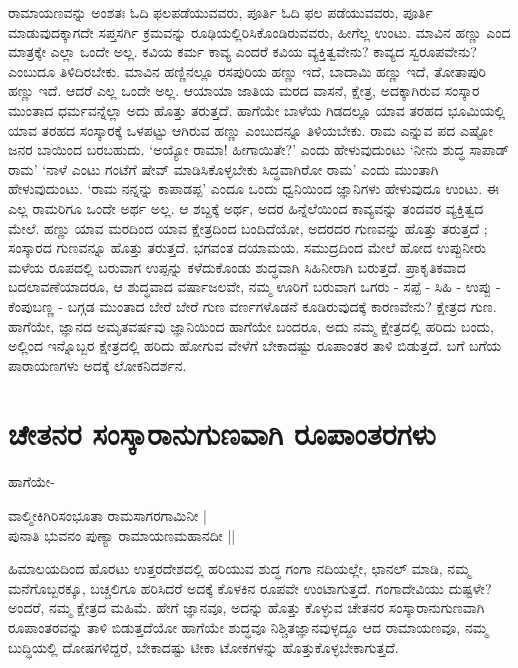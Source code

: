 ರಾಮಾಯಣವನ್ನು ಅಂಶತಃ ಓದಿ ಫಲಪಡೆಯುವವರು, ಪೂರ್ತಿ ಓದಿ ಫಲ ಪಡೆಯುವವರು, ಪೂರ್ತಿ ಮಾಡುವುದಕ್ಕಾಗದೇ ಸಪ್ತಸರ್ಗಿ ಕ್ರಮವನ್ನು ರೂಢಿಯಲ್ಲಿರಿಸಿಕೊಂಡಿರುವವರು, ಹೀಗೆಲ್ಲ ಉಂಟು. ಮಾವಿನ ಹಣ್ಣು ಎಂದ ಮಾತ್ರಕ್ಕೇ ಎಲ್ಲಾ ಒಂದೇ ಅಲ್ಲ. ಕವಿಯ ಕರ್ಮ ಕಾವ್ಯ ಎಂದರೆ ಕವಿಯ ವ್ಯಕ್ತಿತ್ವವೇನು? ಕಾವ್ಯದ ಸ್ವರೂಪವೇನು? ಎಂಬುದೂ ತಿಳಿದಿರಬೇಕು. ಮಾವಿನ ಹಣ್ಣಿನಲ್ಲೂ ರಸಪುರಿಯ ಹಣ್ಣು ಇದೆ, ಬಾದಾಮಿ ಹಣ್ಣು ಇದೆ, ತೋತಾಪುರಿ ಹಣ್ಣು ಇದೆ. ಆದರೆ ಎಲ್ಲ ಒಂದೇ ಅಲ್ಲ. ಆಯಾಯಾ ಜಾತಿಯ ಮರದ ವಾಸನೆ, ಕ್ಷೇತ್ರ, ಅದಕ್ಕಾಗಿರುವ ಸಂಸ್ಕಾರ ಮುಂತಾದ ಧರ್ಮವನ್ನೆಲ್ಲಾ ಅದು ಹೊತ್ತು ತರುತ್ತದೆ. ಹಾಗೆಯೇ ಬಾಳೆಯ ಗಿಡದಲ್ಲೂ ಯಾವ ತರಹದ ಭೂಮಿಯಲ್ಲಿ ಯಾವ ತರಹದ ಸಂಸ್ಕಾರಕ್ಕೆ ಒಳಪಟ್ಟು ಆಗಿರುವ ಹಣ್ಣು ಎಂಬುದನ್ನೂ ತಿಳಿಯಬೇಕು. ರಾಮ ಎನ್ನುವ ಪದ ಎಷ್ಟೋ ಜನರ ಬಾಯಿಂದ ಬರಬಹುದು. `ಅಯ್ಯೋ ರಾಮಾ! ಹೀಗಾಯಿತೇ?' ಎಂದು ಹೇಳುವುದುಂಟು `ನೀನು ಶುದ್ಧ ಸಾಪಾಡ್‍ ರಾಮ' `ನಾಳೆ ಎಂಟು ಗಂಟೆಗೆ ಷೇವ್‍ ಮಾಡಿಸಿಕೊಳ್ಳಬೇಕು ಸಿದ್ಧವಾಗಿರೋ ರಾಮ' ಎಂದು ಮುಂತಾಗಿ ಹೇಳುವುದುಂಟು. `ರಾಮ ನನ್ನನ್ನು ಕಾಪಾಡಪ್ಪ' ಎಂದೂ ಒಂದು ಧ್ವನಿಯಿಂದ ಜ್ಞಾನಿಗಳು ಹೇಳುವುದೂ ಉಂಟು. ಈ ಎಲ್ಲ ರಾಮರಿಗೂ ಒಂದೇ ಅರ್ಥ ಅಲ್ಲ. ಆ ಶಬ್ದಕ್ಕೆ ಅರ್ಥ, ಅದರ ಹಿನ್ನೆಲೆಯಿಂದ ಕಾವ್ಯವನ್ನು ತಂದವರ ವ್ಯಕ್ತಿತ್ವದ ಮೇಲೆ. ಹಣ್ಣು ಯಾವ ಮರದಿಂದ ಯಾವ ಕ್ಷೇತ್ರದಿಂದ ಬಂದಿದೆಯೋ, ಅದರದರ ಗುಣವನ್ನು ಹೊತ್ತು ತರುತ್ತದೆ ; ಸಂಸ್ಕಾರದ ಗುಣವನ್ನೂ ಹೊತ್ತು ತರುತ್ತದೆ. ಭಗವಂತ ದಯಾಮಯ. ಸಮುದ್ರದಿಂದ ಮೇಲೆ ಹೋದ ಉಪ್ಪುನೀರು ಮಳೆಯ ರೂಪದಲ್ಲಿ ಬರುವಾಗ ಉಪ್ಪನ್ನು ಕಳೆದುಕೊಂಡು ಶುದ್ಧವಾಗಿ ಸಿಹಿನೀರಾಗಿ ಬರುತ್ತದೆ. ಪ್ರಾಕೃತಿಕವಾದ ಬದಲಾವಣೆಯಾದರೂ, ಆ ಶುದ್ಧವಾದ ವರ್ಷಾಜಲವೇ, ನಮ್ಮ ಊರಿಗೆ ಬರುವಾಗ ಒಗರು - ಸಪ್ಪೆ - ಸಿಹಿ - ಉಪ್ಪು - ಕೆಂಪುಬಣ್ಣ - ಬಗ್ಗಡ ಮುಂತಾದ ಬೇರೆ ಬೇರೆ ಗುಣ ವರ್ಣಗಳೊಡನೆ ಕೂಡಿರುವುದಕ್ಕೆ ಕಾರಣವೇನು? ಕ್ಷೇತ್ರದ ಗುಣ. ಹಾಗೆಯೇ, ಜ್ಞಾನದ ಅಮೃತವರ್ಷವು ಜ್ಞಾನಿಯಿಂದ ಹಾಗೆಯೇ ಬಂದರೂ, ಅದು ನಮ್ಮ ಕ್ಷೇತ್ರದಲ್ಲಿ ಹರಿದು ಬಂದು, ಅಲ್ಲಿಂದ ಇನ್ನೊಬ್ಬರ ಕ್ಷೇತ್ರದಲ್ಲಿ ಹರಿದು ಹೋಗುವ ವೇಳೆಗೆ ಬೇಕಾದಷ್ಟು ರೂಪಾಂತರ ತಾಳಿ ಬಿಡುತ್ತದೆ. ಬಗೆ ಬಗೆಯ ಪಾರಾಯಣಗಳು ಅದಕ್ಕೆ ಲೋಕನಿದರ್ಶನ. 

\section*{ಚೇತನರ ಸಂಸ್ಕಾರಾನುಗುಣವಾಗಿ ರೂಪಾಂತರಗಳು} 

ಹಾಗೆಯೇ- 

\begin{shloka}
ವಾಲ್ಮೀಕಿಗಿರಿಸಂಭೂತಾ ರಾಮಸಾಗರಗಾಮಿನೀ |\label{174}\\ 
ಪುನಾತಿ ಭುವನಂ ಪುಣ್ಯಾ ರಾಮಾಯಣಮಹಾನದೀ || 
\end{shloka} 

ಹಿಮಾಲಯದಿಂದ ಹೊರಟು ಉತ್ತರದೇಶದಲ್ಲಿ ಹರಿಯುವ ಶುದ್ಧ ಗಂಗಾ ನದಿಯಲ್ಲೇ, ಛಾನಲ್‍ ಮಾಡಿ, ನಮ್ಮ ಮನೆಗೊಬ್ಬರಕ್ಕೂ, ಬಚ್ಚಲಿಗೂ ಹರಿಸಿದರೆ ಅದಕ್ಕೆ ಕೊಳಕಿನ ರೂಪವೇ ಉಂಟಾಗುತ್ತದೆ. ಗಂಗಾದೇವಿಯು ದುಷ್ಟಳೇ? ಅಂದರೆ, ನಮ್ಮ ಕ್ಷೇತ್ರದ ಮಹಿಮೆ. ಹೇಗೆ ಜ್ಞಾನವೂ, ಅದನ್ನು ಹೊತ್ತು ಕೊಳ್ಳುವ ಚೇತನರ ಸಂಸ್ಕಾರಾನುಗುಣವಾಗಿ ರೂಪಾಂತರವನ್ನು ತಾಳಿ ಬಿಡುತ್ತದೆಯೋ ಹಾಗೆಯೇ ಶುದ್ಧವೂ ನಿಶ್ಚಿತಜ್ಞಾನವುಳ್ಳದ್ದೂ ಆದ ರಾಮಾಯಣವೂ, ನಮ್ಮ ಬುದ್ಧಿಯಲ್ಲಿ ದೋಷಗಳಿದ್ದರೆ, ಬೇಕಾದಷ್ಟು ಟೀಕಾ ಟೋಕಗಳನ್ನು ಹೊತ್ತುಕೊಳ್ಳಬೇಕಾಗುತ್ತದೆ. 


